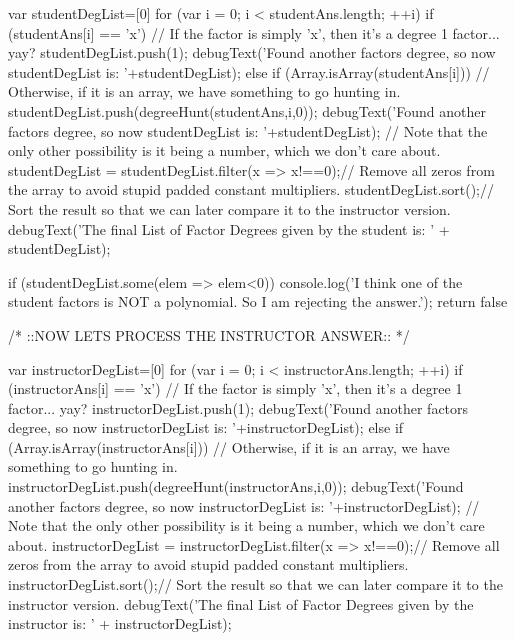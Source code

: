 \documentclass{ximera}
\begin{document}
\begin{javascript}
{    var studentDegList=[0]
    for (var i = 0; i < studentAns.length; ++i) {
        if (studentAns[i] == 'x') {
            // If the factor is simply 'x', then it's a degree 1 factor... yay?
            studentDegList.push(1);
            debugText('Found another factors degree, so now studentDegList is: '+studentDegList); 
        } else if (Array.isArray(studentAns[i])) {
            // Otherwise, if it is an array, we have something to go hunting in.
            studentDegList.push(degreeHunt(studentAns,i,0));
            debugText('Found another factors degree, so now studentDegList is: '+studentDegList); 
        }// Note that the only other possibility is it being a number, which we don't care about.
    }
    studentDegList = studentDegList.filter(x => x!==0);// Remove all zeros from the array to avoid stupid padded constant multipliers.
    studentDegList.sort();// Sort the result so that we can later compare it to the instructor version.
    debugText('The final List of Factor Degrees given by the student is: ' + studentDegList);
    
    if (studentDegList.some(elem => elem<0)) {
        console.log('I think one of the student factors is NOT a polynomial. So I am rejecting the answer.');
        return false
        }
    
    
    /*
        ::NOW LETS PROCESS THE INSTRUCTOR ANSWER::
    */
    
    var instructorDegList=[0]
    for (var i = 0; i < instructorAns.length; ++i) {
        if (instructorAns[i] == 'x') {
            // If the factor is simply 'x', then it's a degree 1 factor... yay?
            instructorDegList.push(1);
            debugText('Found another factors degree, so now instructorDegList is: '+instructorDegList); 
        } else if (Array.isArray(instructorAns[i])) {
            // Otherwise, if it is an array, we have something to go hunting in.
            instructorDegList.push(degreeHunt(instructorAns,i,0));
            debugText('Found another factors degree, so now instructorDegList is: '+instructorDegList); 
        }// Note that the only other possibility is it being a number, which we don't care about.
    }
    instructorDegList = instructorDegList.filter(x => x!==0);// Remove all zeros from the array to avoid stupid padded constant multipliers.
    instructorDegList.sort();// Sort the result so that we can later compare it to the instructor version.
    debugText('The final List of Factor Degrees given by the instructor is: ' + instructorDegList);
    
}
\end{javascript}
\end{document}
